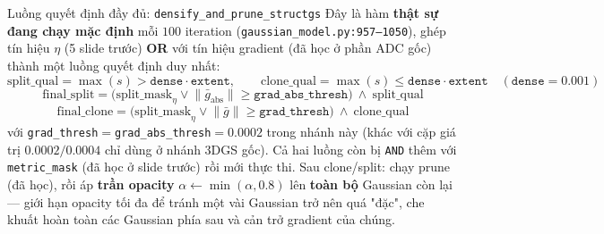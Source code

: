 
\begin{frame}{Luồng quyết định đầy đủ: \texttt{densify\_and\_prune\_structgs}}
\scriptsize
Đây là hàm \textbf{thật sự đang chạy mặc định} mỗi $100$ iteration (\texttt{gaussian\_model.py:957--1050}), ghép tín
hiệu $\eta$ (5 slide trước) \textbf{OR} với tín hiệu gradient (đã học ở phần ADC gốc) thành một luồng quyết định duy nhất:
\[
\text{split\_qual}=\max(s)>\texttt{dense}\cdot\texttt{extent},\qquad \text{clone\_qual}=\max(s)\le\texttt{dense}\cdot\texttt{extent}
\quad(\texttt{dense}=0.001)
\]
\[
\boxed{\;\text{final\_split} = \big(\text{split\_mask}_\eta \lor \lVert\bar g_{\text{abs}}\rVert\ge\texttt{grad\_abs\_thresh}\big)\ \land\ \text{split\_qual}\;}
\]
\[
\boxed{\;\text{final\_clone} = \big(\text{split\_mask}_\eta \lor \lVert\bar g\rVert\ge\texttt{grad\_thresh}\big)\ \land\ \text{clone\_qual}\;}
\]
với \texttt{grad\_thresh}$=$\texttt{grad\_abs\_thresh}$=0.0002$ trong nhánh này (khác với cặp giá trị $0.0002/0.0004$
chỉ dùng ở nhánh 3DGS gốc). Cả hai luồng còn bị \texttt{AND} thêm với \texttt{metric\_mask} (đã học ở slide trước) rồi
mới thực thi. Sau clone/split: chạy prune (đã học), rồi áp \textbf{trần opacity} $\alpha\leftarrow\min(\alpha,0.8)$ lên
\textbf{toàn bộ} Gaussian còn lại --- giới hạn opacity tối đa để tránh một vài Gaussian trở nên quá "đặc", che khuất
hoàn toàn các Gaussian phía sau và cản trở gradient của chúng.
\end{frame}

